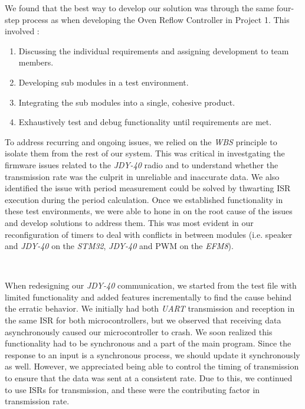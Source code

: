 \documentclass{article}
\begin{document}
We found that the best way to develop our solution was through the same four-step process as when developing the Oven Reflow Controller in Project 1.
This involved : \\

\begin{enumerate}
  \item Discussing the individual requirements and assigning development to team members.
  \item Developing sub modules in a test environment.
  \item Integrating the sub modules into a single, cohesive product.
  \item Exhaustively test and debug functionality until requirements are met.
\end{enumerate}

To address recurring and ongoing issues, we relied on the \textit{WBS} principle to isolate them from the rest of our system.
This was critical in investgating the firmware issues related to the \textit{JDY-40} radio and to understand whether the transmission rate was the culprit
in unreliable and inaccurate data. We also identified the issue with period measurement could be solved by thwarting ISR execution during the period calculation.
Once we established functionality in these test environments, we were able to hone in on the root cause of the issues and develop solutions to address them. This was most evident
in our reconfiguration of timers to deal with conflicts in between modules (i.e. speaker and \textit{JDY-40} on the \textit{STM32}, \textit{JDY-40} and PWM on the \textit{EFM8}).


\

When redesigning our \textit{JDY-40} communication, we started from the test file with limited functionality and added features incrementally to find the cause behind
the erratic behavior. We initially had both \textit{UART} transmission and reception in the same ISR for both microcontrollers, but we observed that receiving data asynchronously
caused our microcontroller to crash. We soon realized this functionality had to be synchronous and a part of the main program. Since the response to an input is a synchronous process,
we should update it synchronously as well. However, we appreciated being able to control the timing of transmission to ensure that the data was sent
at a consistent rate. Due to this, we continued to use ISRs for transmission, and these were the contributing factor in transmission rate.
\end{document}

